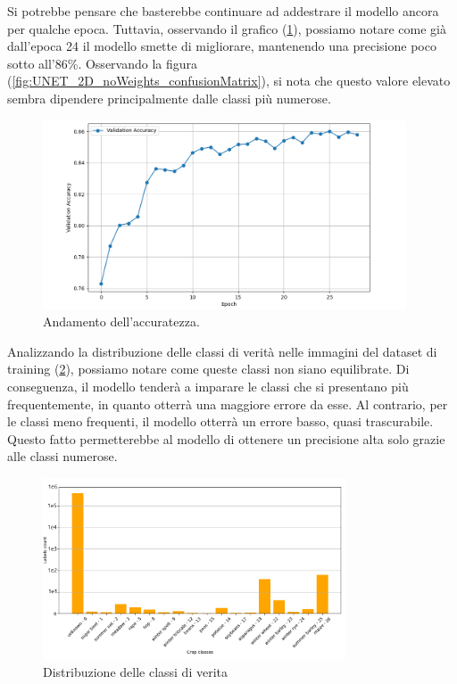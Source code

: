 Si potrebbe pensare che basterebbe continuare ad addestrare il modello 
ancora per qualche epoca. Tuttavia, osservando  il grafico 
(\ref{fig:UNET_2D_noWeights_accuracy}), possiamo notare come già 
dall'epoca 24 il modello smette di migliorare, mantenendo una precisione poco sotto
all'86\%. Osservando la figura (\ref{fig:UNET_2D_noWeights_confusionMatrix}), si nota che 
questo valore elevato sembra dipendere principalmente dalle classi più numerose.



\begin{figure}[H]
    \centering
    \includegraphics[width=0.96\textwidth]{Immagini/sperimentazione/UNET_2D_noWeights_accuracy.png}
    \caption{Andamento dell'accuratezza.}
    \label{fig:UNET_2D_noWeights_accuracy}
\end{figure}

Analizzando la distribuzione delle classi di verità nelle immagini del 
dataset di training (\ref{fig:Distribuzione_delle_label}), 
possiamo notare come queste classi non siano equilibrate. Di conseguenza, il modello tenderà a 
imparare le classi che si presentano più frequentemente, in quanto 
otterrà una maggiore errore da esse.
Al contrario, per le classi meno frequenti, il modello otterrà un errore 
basso, quasi trascurabile. 
Questo fatto permetterebbe al modello di ottenere un precisione alta solo grazie alle 
classi numerose.

\begin{figure}[H]
    \centering
    \includegraphics[width=0.80\textwidth]{Immagini/sperimentazione/Distribuzione_delle_label_edited.png}
    \caption{Distribuzione delle classi di verita}
    \label{fig:Distribuzione_delle_label}
\end{figure}

